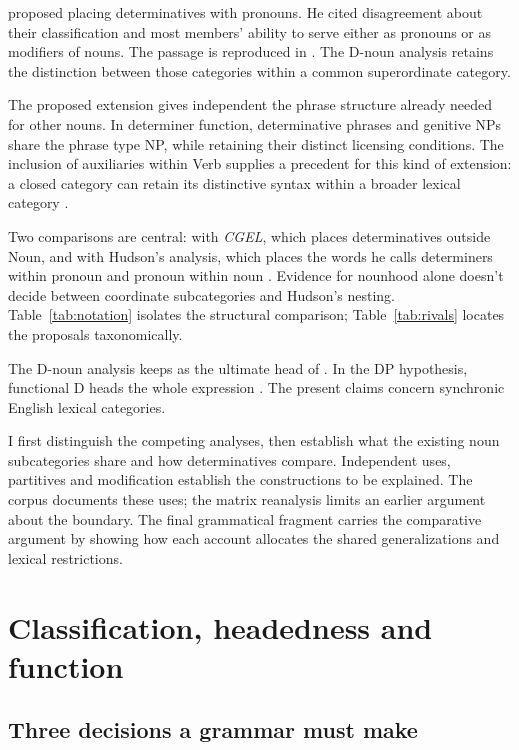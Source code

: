 \documentclass[12pt]{article}
\begin{document}
\textcite[24]{palmer1924} proposed placing determinatives with pronouns. He cited disagreement about their classification and most members' ability to serve either as pronouns or as modifiers of nouns. The passage is reproduced in \textcite[3]{reynolds2013determiners}. The D-noun analysis retains the distinction between those categories within a common superordinate category.

The proposed extension gives independent  the phrase structure already needed for other nouns. In determiner function, determinative phrases and genitive NPs share the phrase type NP, while retaining their distinct licensing conditions. The inclusion of auxiliaries within Verb supplies a precedent for this kind of extension: a closed category can retain its distinctive syntax within a broader lexical category \citep{pullumwilson1977}.

Two comparisons are central: with \textit{CGEL}, which places determinatives outside Noun, and with Hudson's analysis, which places the words he calls determiners within pronoun and pronoun within noun \citep{hudson2004determiners,hudson2010wordgrammar}. Evidence for nounhood alone doesn't decide between coordinate subcategories and Hudson's nesting. Table~\ref{tab:notation} isolates the structural comparison; Table~\ref{tab:rivals} locates the proposals taxonomically.

The D-noun analysis keeps  as the ultimate head of . In the DP hypothesis, functional D heads the whole expression \citep{abney1987}. The present claims concern synchronic English lexical categories.

I first distinguish the competing analyses, then establish what the existing noun subcategories share and how determinatives compare. Independent uses, partitives and modification establish the constructions to be explained. The corpus documents these uses; the matrix reanalysis limits an earlier argument about the boundary. The final grammatical fragment carries the comparative argument by showing how each account allocates the shared generalizations and lexical restrictions.

\section{Classification, headedness and function}\label{sec:alternatives}

\subsection{Three decisions a grammar must make}
\end{document}
